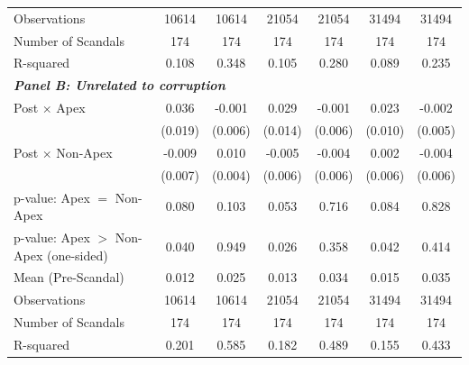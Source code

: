 {\begin{tabular}{l*{6}{c}}
Observations&       10614         &       10614         &       21054         &       21054         &       31494         &       31494         \\
Number of Scandals&         174         &         174         &         174         &         174         &         174         &         174         \\
R-squared   &       0.108         &       0.348         &       0.105         &       0.280         &       0.089         &       0.235         \\
\midrule
\multicolumn{7}{l}{\textbf{\textit{Panel B: Unrelated to corruption}}} \\
Post $\times$ Apex&       0.036\sym{*}  &      -0.001         &       0.029\sym{**} &      -0.001         &       0.023\sym{**} &      -0.002         \\
&     (0.019)         &     (0.006)         &     (0.014)         &     (0.006)         &     (0.010)         &     (0.005)         \\
Post $\times$ Non-Apex&      -0.009         &       0.010\sym{**} &      -0.005         &      -0.004         &       0.002         &      -0.004         \\
&     (0.007)         &     (0.004)         &     (0.006)         &     (0.006)         &     (0.006)         &     (0.006)         \\
\midrule
p-value: Apex $=$ Non-Apex&       0.080         &       0.103         &       0.053         &       0.716         &       0.084         &       0.828         \\
p-value: Apex $>$ Non-Apex (one-sided)&       0.040         &       0.949         &       0.026         &       0.358         &       0.042         &       0.414         \\
Mean (Pre-Scandal)&       0.012         &       0.025         &       0.013         &       0.034         &       0.015         &       0.035         \\
Observations&       10614         &       10614         &       21054         &       21054         &       31494         &       31494         \\
Number of Scandals&         174         &         174         &         174         &         174         &         174         &         174         \\
R-squared   &       0.201         &       0.585         &       0.182         &       0.489         &       0.155         &       0.433         \\
\bottomrule
\end{tabular}
}
